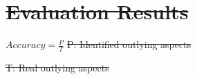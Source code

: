 \documentclass[
 size=14pt,
 paper=smartboard,  %
 mode=present, 		%
 display=slides, 	%
 style=tuliplab,  	%
 pauseslide,
 fleqn,leqno]{powerdot}
\providecommand{\DIFdeltex}[1]{{\protect\color{red}\sout{#1}}}                      %
\providecommand{\DIFdelbegin}{} %
\providecommand{\DIFdelend}{} %
\providecommand{\DIFdel}[1]{\texorpdfstring{\DIFdeltex{#1}}{}} %
\newcommand{\DIFscaledelfig}{0.5}
\newlength{\DIFdelgraphicswidth} %
\newlength{\DIFdelgraphicsheight} %
\newcommand{\DIFdelincludegraphics}[2][]{%
\sbox{\DIFdelgraphicsbox}{\DIFOincludegraphics[#1]{#2}}%
\settoboxwidth{\DIFdelgraphicswidth}{\DIFdelgraphicsbox} %
\settoboxtotalheight{\DIFdelgraphicsheight}{\DIFdelgraphicsbox} %
\scalebox{\DIFscaledelfig}{%
\parbox[b]{\DIFdelgraphicswidth}{\usebox{\DIFdelgraphicsbox}\\[-\baselineskip] \rule{\DIFdelgraphicswidth}{0em}}\llap{\resizebox{\DIFdelgraphicswidth}{\DIFdelgraphicsheight}{%
\setlength{\unitlength}{\DIFdelgraphicswidth}%
\begin{picture}(1,1)%
\thicklines\linethickness{2pt} %
{\color[rgb]{1,0,0}\put(0,0){\framebox(1,1){}}}%
{\color[rgb]{1,0,0}\put(0,0){\line( 1,1){1}}}%
{\color[rgb]{1,0,0}\put(0,1){\line(1,-1){1}}}%
\end{picture}%
}\hspace*{3pt}}} %
} %
\DeclareRobustCommand{\DIFdelbegin}{\DIFOdelbegin \let\includegraphics\DIFdelincludegraphics} %
\DeclareRobustCommand{\DIFdelend}{\DIFOaddend \let\includegraphics\DIFOincludegraphics} %
\begin{document}
\DIFdelbegin \section{\DIFdel{Evaluation Results}}
\addtocounter{section}{-1}%

\DIFdelend %
\DIFdelbegin %
\DIFdelend %

\DIFdelbegin %
\DIFdelend %

\DIFdelbegin %
\DIFdel{$Accuracy = \frac{P}{T}$ }%
\DIFdel{P: Identified outlying aspects }%
\DIFdelend %

\DIFdelbegin \DIFdel{T: Real outlying aspects}%
\DIFdelend %

\DIFdelbegin %
\DIFdelend %
\end{document}
